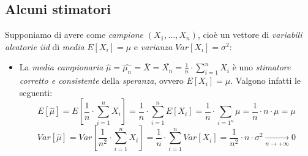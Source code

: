 \documentclass[12pt, a4paper]{report}
\theoremstyle{definition}
\begin{document}
\subsection{Alcuni stimatori}
Supponiamo di avere come \emph{campione} \((X_1,\dots,X_n)\), cioè un vettore di
\emph{variabili aleatorie iid} di \emph{media} \(E[X_i]=\mu\) e \emph{varianza}
\(Var[X_i]=\sigma^2\):
\begin{itemize}
	\item La \emph{media campionaria} \(\hat{\mu}=\hat{\mu_n}=\bar{X}=\bar{X_n}
	=\frac{1}{n}\cdot \sum_{i=1}^nX_i\) è uno \emph{stimatore corretto e consistente}
	della \emph{speranza}, ovvero \(E[X_i]=\mu\). Valgono infatti le seguenti:
	\[E[\hat{\mu}]=E\left[\frac{1}{n}\cdot \sum_{i=1}^nX_i\right]=\frac{1}{n}
	\cdot \sum_{i=1}^nE[X_i]=\frac{1}{n}\cdot \sum_{i=1^n}\mu=\frac{1}{n}\cdot n\cdot \mu=\mu\]
	\[Var[\hat{\mu}]=Var\left[\frac{1}{n^2}\cdot \sum_{i=1}^nX_i\right]=\frac{1}{n}\cdot 
	\sum_{i=1}^nVar[X_i]=\frac{1}{n^2}\cdot n\cdot \sigma^2\xrightarrow[n\to+\infty]{}0\]


\end{itemize}
\end{document}
